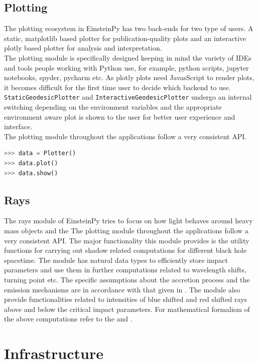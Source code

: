 \documentclass[onecolumn]{aa}
\begin{document}
\subsection{Plotting}
The plotting ecosystem in EinsteinPy has two back-ends for two type of users. A static, matplotlib based plotter for publication-quality plots and an interactive plotly based plotter for analysis and interpretation. \\
The plotting module is specifically designed keeping in mind the variety of IDEs and tools people working with Python use, for example, python scripts, jupyter notebooks, spyder, pycharm etc. As plotly plots need JavasScript to render plots, it becomes difficult for the first time user to decide which backend to use. \texttt{StaticGeodesicPlotter} and \texttt{InteractiveGeodesicPlotter} undergo an internal switching depending on the environment variables and the appropriate environment aware plot is shown to the user for better user experience and interface.\\
The plotting module throughout the applications follow a very consistent API. \begin{lstlisting}[language=Python, caption=Plotting Module API]
>>> data = Plotter()
>>> data.plot()
>>> data.show()
\end{lstlisting}

\subsection{Rays}
The rays module of EinsteinPy tries to focus on how light behaves around heavy mass objects and the 
The plotting module throughout the applications follow a very consistent API. 
The major functionality this module provides is the utility functions for carrying out shadow related computations for different black hole spacetime. The module has natural data types to efficiently store impact parameters and use them in further computations related to wavelength shifts, turning point etc. The specific assumptions about the accretion process and the emission mechanisms are in accordance with that given in \citep{Bambi_2013}.
The module also provide functionalities related to intensities of blue shifted and red shifted rays above and below the critical impact parameters. For mathematical formalism of the above computations refer to the \citep{Bambi_2013} and \citep{Shaikh_2018}.


\section{Infrastructure} \label{sec:infra}
\end{document}
